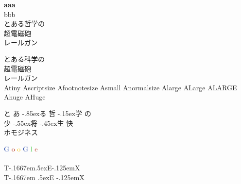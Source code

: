 \documentclass[30pt]{article}
\makeatletter
\def\kaka{T\kern-.1667em\lower.5ex\hbox{E}\kern-.125emX\@}
\makeatother
\begin{document}
\begin{CJK}{UTF8}{song}


\begin{center}

{\Large
\textbf{aaa}\\
}
bbb\\


とある哲学の\\
超電磁砲\\
レールガン\\

\end{center}

とある科学の\\
超電磁砲\\
レールガン\\
{
\tiny{Atiny}
\scriptsize{Ascriptsize}
\footnotesize{Afootnotesize}
\small{Asmall}
\normalsize{Anormalsize}
\large{Alarge}
\Large{ALarge}
\LARGE{ALARGE}
\huge{Ahuge}
\Huge{AHuge}
}

\begin{center}
{
\Huge{と}\hspace{-11pt}\vspace{-8pt}
\LARGE{あ}\hspace{-10pt}
\Large{\lower-.85ex\hbox{る}}\hspace{-5pt}
\Huge{哲}\hspace{-6pt}
\huge{\lower-.15ex\hbox{学}}\hspace{-5pt}
\Huge{の}\\
\Huge{少}\hspace{-4pt}
\Large{\lower-.55ex\hbox{将}}
\LARGE{\lower-.45ex\hbox{生}}\hspace{-3pt}
\Huge{快}\vspace{-9pt}
\\
\scriptsize
ホモジネス
}
\end{center}

{\Huge
\textcolor[HTML]{2F50AD}{G}%
\textcolor[HTML]{B32F17}{o}%
\textcolor[HTML]{F3C20B}{o}%
\Large
\textcolor[HTML]{2F50AD}{G}%
\Huge
\textcolor[HTML]{48C847}{l}%
\textcolor[HTML]{B32F17}{e}} 
\\
\\
\kaka
\\
T\kern-.1667em
\lower.5ex\hbox{E}
\kern-.125emX\@



\end{CJK}
\end{document}
